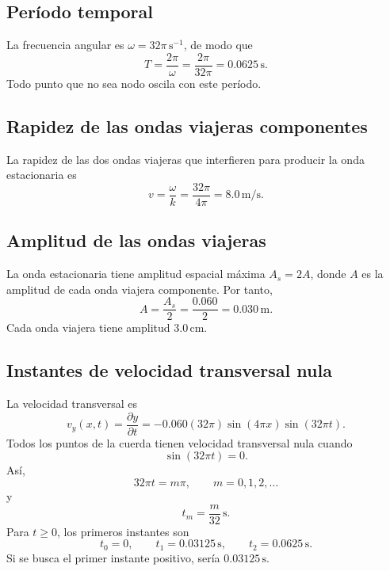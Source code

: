 \documentclass[
  letterpaper,
  DIV=11,
  numbers=noendperiod]{scrreprt}
\begin{document}
\subsection{Período temporal}\label{peruxedodo-temporal}

La frecuencia angular es \(\omega=32\pi\,\text{s}^{-1}\), de modo que \[
T=\frac{2\pi}{\omega}=\frac{2\pi}{32\pi}=0.0625\,\text{s}.
\] Todo punto que no sea nodo oscila con este período.

\subsection{Rapidez de las ondas viajeras
componentes}\label{rapidez-de-las-ondas-viajeras-componentes}

La rapidez de las dos ondas viajeras que interfieren para producir la
onda estacionaria es \[
v=\frac{\omega}{k}=\frac{32\pi}{4\pi}=8.0\,\text{m/s}.
\]

\subsection{Amplitud de las ondas
viajeras}\label{amplitud-de-las-ondas-viajeras}

La onda estacionaria tiene amplitud espacial máxima \(A_s=2A\), donde
\(A\) es la amplitud de cada onda viajera componente. Por tanto, \[
A=\frac{A_s}{2}=\frac{0.060}{2}=0.030\,\text{m}.
\] Cada onda viajera tiene amplitud \(3.0\,\text{cm}\).

\subsection{Instantes de velocidad transversal
nula}\label{instantes-de-velocidad-transversal-nula}

La velocidad transversal es \[
v_y(x,t)=\frac{\partial y}{\partial t}
=-0.060(32\pi)\sin(4\pi x)\sin(32\pi t).
\] Todos los puntos de la cuerda tienen velocidad transversal nula
cuando \[
\sin(32\pi t)=0.
\] Así, \[
32\pi t=m\pi, \qquad m=0,1,2,\dots
\] y \[
t_m=\frac{m}{32}\,\text{s}.
\] Para \(t\geq 0\), los primeros instantes son \[
t_0=0, \qquad t_1=0.03125\,\text{s}, \qquad t_2=0.0625\,\text{s}.
\] Si se busca el primer instante positivo, sería \(0.03125\,\text{s}\).
\end{document}
